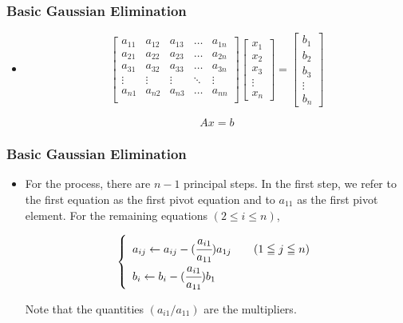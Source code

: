 \documentclass[notheorems,mathserif,table,compress]{beamer}  %
\begin{document}
\begin{frame}
\frametitle{Basic Gaussian Elimination}
\begin{itemize}
\item 
\begin{displaymath}
\begin{bmatrix}
a_{11} & a_{12} & a_{13} & \ldots & a_{1n}\\
a_{21} & a_{22} & a_{23} & \ldots & a_{2n}\\
a_{31} & a_{32} & a_{33} & \ldots & a_{3n}\\
\vdots & \vdots & \vdots & \ddots & \vdots \\
a_{n1} & a_{n2} & a_{n3} & \ldots & a_{nn}\\
\end{bmatrix}
\begin{bmatrix}
x_1\\
x_2\\
x_3\\
\vdots\\
x_n
\end{bmatrix}
=\begin{bmatrix}
b_1\\
b_2\\
b_3\\
\vdots\\
b_n
\end{bmatrix}
\end{displaymath}

\begin{displaymath}
Ax=b
\end{displaymath}

\end{itemize}
\end{frame}

\begin{frame}
\frametitle{Basic Gaussian Elimination}
\begin{itemize}
\item For the process, there are $n−1$ principal steps. In the first step, we refer to the first equation as the first \textsf{pivot equation} and to $a_{11}$ as the first \textsf{pivot element}. For the remaining equations $(2\leq i\leq n)$,

\begin{eqnarray*}
\left \{\begin{array}{ll}
a_{ij}\leftarrow a_{ij}-(\cfrac{a_{i1}}{a_{11}})a_{1j} \qquad (1\leqq j\leqq n)\\
b_{i}\leftarrow b_{i}-(\cfrac{a_{i1}}{a_{11}})b_{1} 
\end{array} \right.
\end{eqnarray*}

Note that the quantities $(a_{i1}/a_{11})$ are the \textsf{multipliers}.
\end{itemize}
\end{frame}
\end{document}
